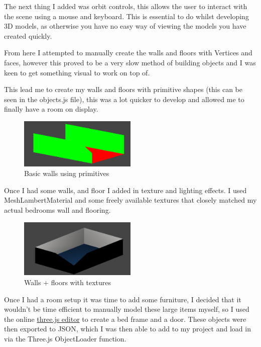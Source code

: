 \documentclass[runningheads,a4paper]{llncs}
\begin{document}
  The next thing I added was orbit controls, this allows the user to interact with the scene using a mouse and keyboard. This is essential to do whilst developing 3D models, as otherwise you have no easy way of viewing the models you have created quickly. 

  From here I attempted to manually create the walls and floors with Vertices and faces, however this proved to be a very slow method of building objects and I was keen to get something visual to work on top of. 

  This lead me to create my walls and floors with primitive shapes (this can be seen in the objects.js file), this was a lot quicker to develop and allowed me to finally have a room on display. 

  \begin{figure}[H]
    \centering
    \includegraphics[width=0.5\textwidth]{images/2.png}
    \caption{Basic walls using primitives}
    \label{fig:window}
  \end{figure}
  
  Once I had some walls, and floor I added in texture and lighting effects. I used MeshLambertMaterial and some freely available textures\cite{textures} that closely matched my actual bedrooms wall and flooring.

  \begin{figure}[H]
    \centering
    \includegraphics[width=0.5\textwidth]{images/3.png}
    \caption{Walls + floors with textures}
    \label{fig:window}
  \end{figure}

  Once I had a room setup it was time to add some furniture, I decided that it wouldn't be time efficient to manually model these large items myself, so I used the online \href{https://threejs.org/editor/}{three.js editor} to create a bed frame and a door.
  These objects were then exported to JSON, which I was then able to add to my project and load in via the Three.js ObjectLoader function. 
\end{document}
